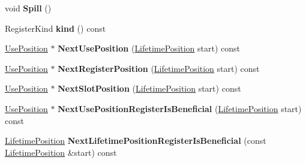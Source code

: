 \begin{DoxyCompactItemize}
\mbox{\label{classv8_1_1internal_1_1compiler_1_1LiveRange_a89df2239ef516ac0f434db1f292bd59e}} 
void {\bfseries Spill} ()
\item 
\mbox{\label{classv8_1_1internal_1_1compiler_1_1LiveRange_a19f4fec6fa23b83b0d23edbe867cdbc4}} 
Register\+Kind {\bfseries kind} () const
\item 
\mbox{\label{classv8_1_1internal_1_1compiler_1_1LiveRange_af5100310a98d5f099ba716745d4efc49}} 
\mbox{\hyperlink{classv8_1_1internal_1_1compiler_1_1UsePosition}{Use\+Position}} $\ast$ {\bfseries Next\+Use\+Position} (\mbox{\hyperlink{classv8_1_1internal_1_1compiler_1_1LifetimePosition}{Lifetime\+Position}} start) const
\item 
\mbox{\label{classv8_1_1internal_1_1compiler_1_1LiveRange_ad55ec778797396dd0a25845aa33eab39}} 
\mbox{\hyperlink{classv8_1_1internal_1_1compiler_1_1UsePosition}{Use\+Position}} $\ast$ {\bfseries Next\+Register\+Position} (\mbox{\hyperlink{classv8_1_1internal_1_1compiler_1_1LifetimePosition}{Lifetime\+Position}} start) const
\item 
\mbox{\label{classv8_1_1internal_1_1compiler_1_1LiveRange_a7c2f2f2aed03775ab97e6b725a5ed5cb}} 
\mbox{\hyperlink{classv8_1_1internal_1_1compiler_1_1UsePosition}{Use\+Position}} $\ast$ {\bfseries Next\+Slot\+Position} (\mbox{\hyperlink{classv8_1_1internal_1_1compiler_1_1LifetimePosition}{Lifetime\+Position}} start) const
\item 
\mbox{\label{classv8_1_1internal_1_1compiler_1_1LiveRange_ac83eafe002b988d6bc8d363732895b9e}} 
\mbox{\hyperlink{classv8_1_1internal_1_1compiler_1_1UsePosition}{Use\+Position}} $\ast$ {\bfseries Next\+Use\+Position\+Register\+Is\+Beneficial} (\mbox{\hyperlink{classv8_1_1internal_1_1compiler_1_1LifetimePosition}{Lifetime\+Position}} start) const
\item 
\mbox{\label{classv8_1_1internal_1_1compiler_1_1LiveRange_a3211ddcdcac4f434be57687a9d97ee53}} 
\mbox{\hyperlink{classv8_1_1internal_1_1compiler_1_1LifetimePosition}{Lifetime\+Position}} {\bfseries Next\+Lifetime\+Position\+Register\+Is\+Beneficial} (const \mbox{\hyperlink{classv8_1_1internal_1_1compiler_1_1LifetimePosition}{Lifetime\+Position}} \&start) const

\end{DoxyCompactItemize}
